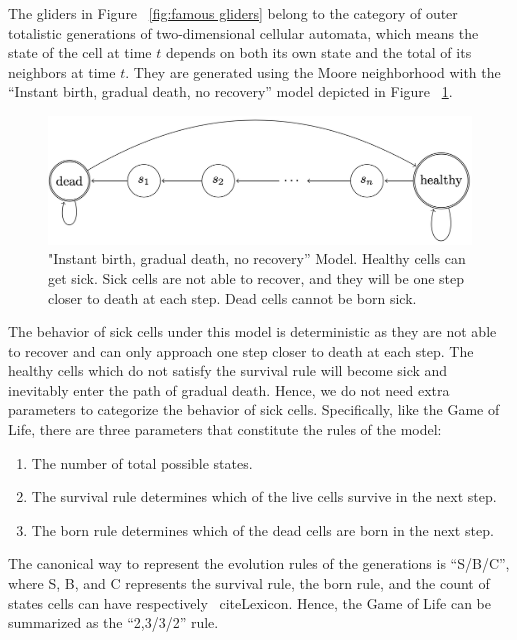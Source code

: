 \documentclass[12pt]{article}
\numberwithin{figure}{section} %
\begin{document}
The gliders in Figure ~\ref{fig:famous gliders} belong to the category of outer totalistic generations of two-dimensional cellular automata, which means the state of the cell at time $t$ depends on both its own state and the total of its neighbors at time $t$. They are generated using the Moore neighborhood with the “Instant birth, gradual death, no recovery” model depicted in Figure ~\ref{fig:IGN model}. 

\begin{figure}[H]
\centering
\includegraphics[width=\linewidth]{Section1/9}
\caption["Instant birth, gradual death, no recovery” Model]{"Instant birth, gradual death, no recovery” Model. Healthy cells can get sick. Sick cells are not able to recover, and they will be one step closer to death at each step. Dead cells cannot be born sick.}
\label{fig:IGN model}
\vspace{-1.5em}
\end{figure}

The behavior of sick cells under this model is deterministic as they are not able to recover and can only approach one step closer to death at each step. The healthy cells which do not satisfy the survival rule will become sick and inevitably enter the path of gradual death. Hence, we do not need extra parameters to categorize the behavior of sick cells. Specifically, like the Game of Life, there are three parameters that constitute the rules of the model: 
\begin{enumerate}[topsep=0pt,itemsep=-1ex,partopsep=1ex,parsep=1ex]
\item The number of total possible states. 
\item The survival rule determines which of the live cells survive in the next step. 
\item The born rule determines which of the dead cells are born in the next step. 
\end{enumerate}
The canonical way to represent the evolution rules of the generations is “S/B/C”, where S, B, and C represents the survival rule, the born rule, and the count of states cells can have respectively ~cite{Lexicon}. Hence, the Game of Life can be summarized as the “2,3/3/2” rule.
\end{document}
